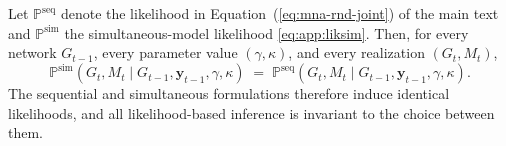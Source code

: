 \begin{proposition}%
\label{prop:app:equiv}
Let $\mathbb{P}^{\mathrm{seq}}$ denote the likelihood in
Equation~(\ref{eq:mna-rnd-joint}) of the main text and
$\mathbb{P}^{\mathrm{sim}}$ the simultaneous-model likelihood
\eqref{eq:app:liksim}. Then, for every network $G_{t-1}$, every
parameter value $(\gamma,\kappa)$, and every realization $(G_t, M_t)$,
\begin{equation}
  \mathbb{P}^{\mathrm{sim}}(G_t, M_t \mid G_{t-1},
  \mathbf{y}_{t-1}, \gamma, \kappa)
  \;=\;
  \mathbb{P}^{\mathrm{seq}}(G_t, M_t \mid G_{t-1},
  \mathbf{y}_{t-1}, \gamma, \kappa).
  \label{eq:app:exact}
\end{equation}
The sequential and simultaneous formulations therefore induce identical
likelihoods, and all likelihood-based inference is invariant to the
choice between them.
\end{proposition}
